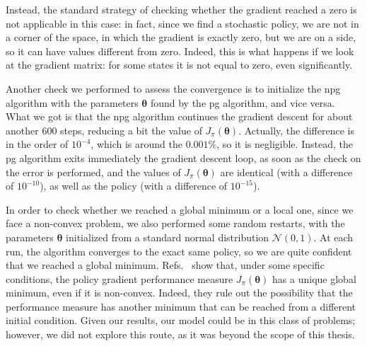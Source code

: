 Instead, the standard strategy of checking whether the gradient reached a zero is not applicable in this case: in fact, since we find a stochastic policy, we are not in a corner of the space, in which the gradient is exactly zero, but we are on a side, so it can have values different from zero. Indeed, this is what happens if we look at the gradient matrix: for some states it is not equal to zero, even significantly.

Another check we performed to assess the convergence is to initialize the \acrshort{npg} algorithm with the parameters $\boldsymbol \theta$ found by the \acrshort{pg} algorithm, and vice versa. What we got is that the \acrshort{npg} algorithm continues the gradient descent for about another $600$ steps, reducing a bit the value of $J_\pi(\boldsymbol \theta)$. Actually, the difference is in the order of $10^{-4}$, which is around the $0.001\%$, so it is negligible. Instead, the \acrshort{pg} algorithm exits immediately the gradient descent loop, as soon as the check on the error is performed, and the values of $J_\pi(\boldsymbol \theta)$ are identical (with a difference of $10^{-10}$), as well as the policy (with a difference of $10^{-15}$).

In order to check whether we reached a global minimum or a local one, since we face a non-convex problem, we also performed some random restarts, with the parameters $\boldsymbol \theta$ initialized from a standard normal distribution $\mathcal N(0,1)$. At each run, the algorithm converges to the exact same policy, so we are quite confident that we reached a global minimum. Refs.~\cite{Bhandari2019, bhandari2020note} show that, under some specific conditions, the policy gradient performance measure $J_\pi(\boldsymbol \theta)$ has a unique global minimum, even if it is non-convex. Indeed, they rule out the possibility that the performance measure has another minimum that can be reached from a different initial condition. Given our results, our model could be in this class of problems; however, we did not explore this route, as it was beyond the scope of this thesis.


